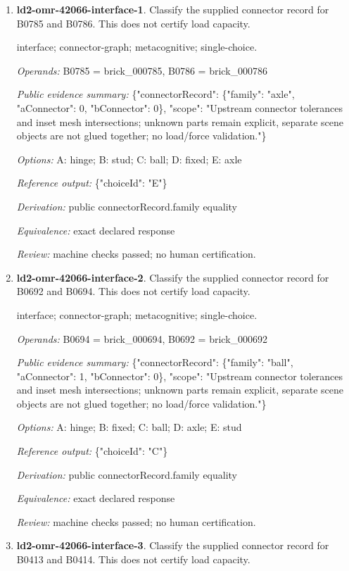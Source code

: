 \begin{enumerate}
\item \textbf{ld2-omr-42066-interface-1}. Classify the supplied connector record for B0785 and B0786. This does not certify load capacity.
\par{\small interface; connector-graph; metacognitive; single-choice.\par\textit{Operands:} B0785 = brick\_000785, B0786 = brick\_000786\par\textit{Public evidence summary:} \{"connectorRecord": \{"family": "axle", "aConnector": 0, "bConnector": 0\}, "scope": "Upstream connector tolerances and inset mesh intersections; unknown parts remain explicit, separate scene objects are not glued together; no load/force validation."\}\par\textit{Options:} A: hinge; B: stud; C: ball; D: fixed; E: axle\par\textit{Reference output:} \{"choiceId": "E"\}\par\textit{Derivation:} public connectorRecord.family equality\par\textit{Equivalence:} exact declared response\par\textit{Review:} machine checks passed; no human certification.}
\item \textbf{ld2-omr-42066-interface-2}. Classify the supplied connector record for B0692 and B0694. This does not certify load capacity.
\par{\small interface; connector-graph; metacognitive; single-choice.\par\textit{Operands:} B0694 = brick\_000694, B0692 = brick\_000692\par\textit{Public evidence summary:} \{"connectorRecord": \{"family": "ball", "aConnector": 1, "bConnector": 0\}, "scope": "Upstream connector tolerances and inset mesh intersections; unknown parts remain explicit, separate scene objects are not glued together; no load/force validation."\}\par\textit{Options:} A: hinge; B: fixed; C: ball; D: axle; E: stud\par\textit{Reference output:} \{"choiceId": "C"\}\par\textit{Derivation:} public connectorRecord.family equality\par\textit{Equivalence:} exact declared response\par\textit{Review:} machine checks passed; no human certification.}
\item \textbf{ld2-omr-42066-interface-3}. Classify the supplied connector record for B0413 and B0414. This does not certify load capacity.

\end{enumerate}
